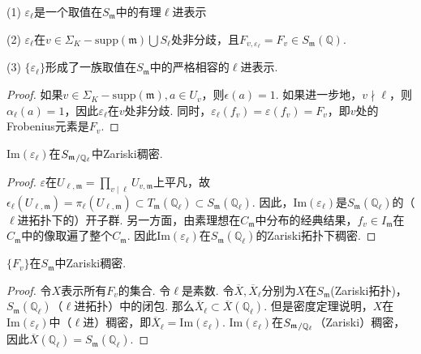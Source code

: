 \begin{cthm}
    (1) $\varepsilon_{\ell}$是一个取值在$S_{\mathfrak{m}}$中的有理$\ell$进表示

    (2) $\varepsilon_{\ell}$在$v\in \Sigma_K - \mathrm{supp}(\mathfrak{m})\bigcup S_{\ell}$处非分歧，且$F_{v, \varepsilon_{\ell}} = F_v \in S_{\mathfrak{m}}(\mathbb{Q})$.

    (3) $\{\varepsilon_{\ell}\}$形成了一族取值在$S_{\mathfrak{m}}$中的严格相容的$\ell$进表示.
\end{cthm}

\begin{proof}
    如果$v\in \Sigma_K - \mathrm{supp}(\mathfrak{m}), a\in U_v$，则$\epsilon(a) = 1$. 如果进一步地，$v\nmid \ell$，则$\alpha_{\ell}(a) = 1$，因此$\varepsilon_{\ell}$在$v$处非分歧. 同时，$\varepsilon_{\ell}(f_v)=\varepsilon(f_v) = F_v$，即$v$处的Frobenius元素是$F_v$.
\end{proof}

\begin{cthm}
    $\mathrm{Im}(\varepsilon_{\ell})$在${S_{\mathfrak{m}}}_{/\mathbb{Q}_{\ell}}$中Zariski稠密.
\end{cthm}

\begin{proof}
    $\varepsilon$在$U_{\ell, \mathfrak{m}} = \prod_{v\mid \ell} U_{v, \mathfrak{m}}$上平凡，故$\epsilon_{\ell}(U_{\ell, \mathfrak{m}}) = \pi_{\ell}(U_{\ell, \mathfrak{m}})\subset T_{\mathfrak{m}}(\mathbb{Q}_{\ell}) \subset S_{\mathfrak{m}}(\mathbb{Q}_{\ell})$. 因此，$\mathrm{Im}(\varepsilon_{\ell})$是$S_{\mathfrak{m}}(\mathbb{Q}_{\ell})$的（$\ell$进拓扑下的）开子群. 另一方面，由素理想在$C_{\mathfrak{m}}$中分布的经典结果，$f_v\in I_{\mathfrak{m}}$在$C_{\mathfrak{m}}$中的像取遍了整个$C_{\mathfrak{m}}$.
    因此$\mathrm{Im}(\varepsilon_{\ell})$在$S_{\mathfrak{m}}(\mathbb{Q}_{\ell})$的Zariski拓扑下稠密.
\end{proof}

\begin{ccor}
    $\{F_v\}$在$S_{\mathfrak{m}}$中Zariski稠密. \label{reps::sm::frob_dense}
\end{ccor}

\begin{proof}
    令$X$表示所有$F_v$的集合. 令$\ell$是素数. 令$\overline{X}, \overline{X}_{\ell}$分别为$X$在$S_{\mathfrak{m}}$(Zariski拓扑)，$S_{\mathfrak{m}}(\mathbb{Q}_{\ell})$（$\ell$进拓扑）中的闭包. 那么$\overline{X}_{\ell}\subset \overline{X}(\mathbb{Q}_{\ell})$. 但是\Chebotarev 密度定理说明，$X$在$\mathrm{Im}(\varepsilon_{\ell})$中（$\ell$进）稠密，即$\overline{X}_{\ell} = \mathrm{Im}(\varepsilon_{\ell})$. $\mathrm{Im}(\varepsilon_{\ell})$在${S_{\mathfrak{m}}}_{/\mathbb{Q}_{\ell}}$（Zariski）稠密，因此$\overline{X}(\mathbb{Q}_{\ell}) = S_{\mathfrak{m}}(\mathbb{Q}_{\ell})$.
\end{proof}

